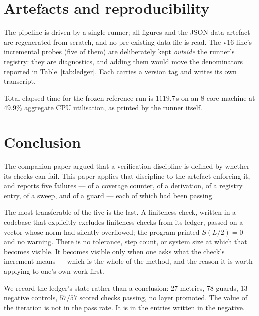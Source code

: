 \documentclass[11pt,a4paper]{article}
\begin{document}
\section{Artefacts and reproducibility}
\label{sec:artefacts}

The pipeline is driven by a single runner; all figures and the JSON data
artefact are regenerated from scratch, and no pre-existing data file is read.
The v16 line's incremental probes (five of them) are deliberately kept
\emph{outside} the runner's registry: they are diagnostics, and adding them
would move the denominators reported in Table~\ref{tab:ledger}. Each carries a
version tag and writes its own transcript.

Total elapsed time for the frozen reference run is $1119.7$\,s on an 8-core
machine at $49.9\%$ aggregate CPU utilisation, as printed by the runner itself.

\section{Conclusion}
\label{sec:conclusion}

The companion paper argued that a verification discipline is defined by whether
its checks can fail. This paper applies that discipline to the artefact
enforcing it, and reports five failures --- of a coverage counter, of a
derivation, of a registry entry, of a sweep, and of a guard --- each of which
had been passing.

The most transferable of the five is the last. A finiteness check, written in a
codebase that explicitly excludes finiteness checks from its ledger, passed on a
vector whose norm had silently overflowed; the program printed $S(L/2) = 0$ and
no warning. There is no tolerance, step count, or system size at which that
becomes visible. It becomes visible only when one asks what the check's
increment means --- which is the whole of the method, and the reason it is worth
applying to one's own work first.

We record the ledger's state rather than a conclusion: 27 metrics, 78 guards, 13
negative controls, $57/57$ scored checks passing, no layer promoted. The value
of the iteration is not in the pass rate. It is in the entries written in the
negative.
\end{document}

